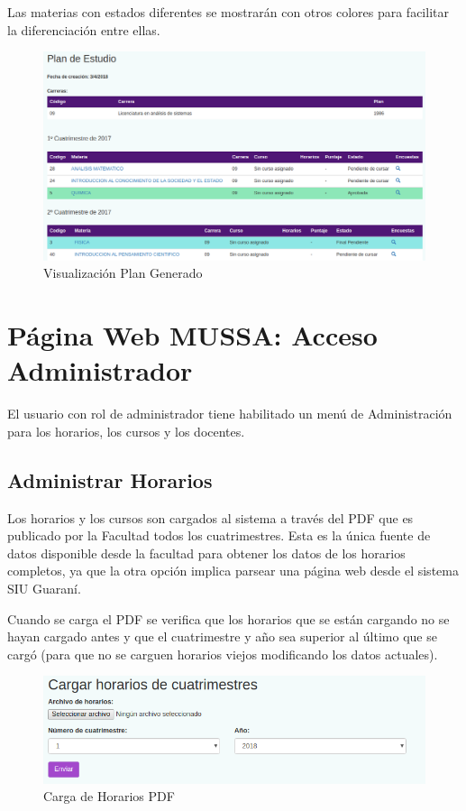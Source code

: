 \documentclass[a4paper]{article}
\begin{document}
Las materias con estados diferentes se mostrarán con otros colores para facilitar la diferenciación entre ellas.

\begin{figure}[H]
\centering
\includegraphics[scale=0.35]{Imagenes/vista_plan_generado.png}\par
\caption{Visualización Plan Generado}
\end{figure}

\newpage
\section{Página Web MUSSA: Acceso Administrador}

El usuario con rol de administrador tiene habilitado un menú de Administración para los horarios, los cursos y los docentes.

\subsection{Administrar Horarios}

Los horarios y los cursos son cargados al sistema a través del PDF que es publicado por la Facultad todos los cuatrimestres. Esta es la única fuente de datos disponible desde la facultad para obtener los datos de los horarios completos, ya que la otra opción implica parsear una página web desde el sistema SIU Guaraní.

Cuando se carga el PDF se verifica que los horarios que se están cargando no se hayan cargado antes y que el cuatrimestre y año sea superior al último que se cargó (para que no se carguen horarios viejos modificando los datos actuales).

\begin{figure}[H]
\centering
\includegraphics[scale=0.35]{Imagenes/administrar_horarios.png}\par
\caption{Carga de Horarios PDF}
\end{figure}
\end{document}

